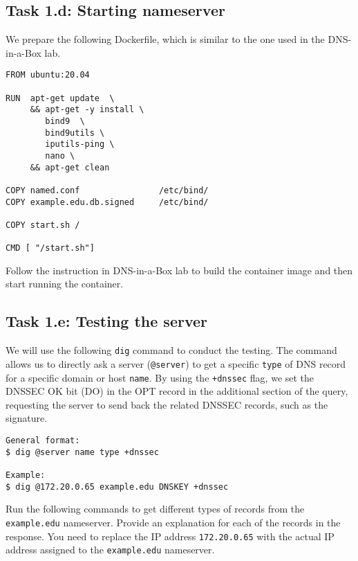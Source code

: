 \subsection{Task 1.d: Starting nameserver}

We prepare the following Dockerfile, which is similar to the one used in 
the DNS-in-a-Box lab. 

\begin{lstlisting}
FROM ubuntu:20.04

RUN  apt-get update  \
     && apt-get -y install \
        bind9  \
        bind9utils \
        iputils-ping \
        nano \
     && apt-get clean

COPY named.conf                /etc/bind/
COPY example.edu.db.signed     /etc/bind/

COPY start.sh /

CMD [ "/start.sh"]
\end{lstlisting}
 
Follow the instruction in DNS-in-a-Box lab to build the container image 
and then start running the container. 


\subsection{Task 1.e: Testing the server}


We will use the following \texttt{dig} command to conduct the testing. 
The command allows us to directly ask 
a server (\texttt{@server}) to get a specific \texttt{type}
of DNS record for a specific domain or host \texttt{name}.
By using the \texttt{+dnssec} flag, we set the DNSSEC OK bit (DO) in the OPT record 
in the additional section of the query, requesting the server to
send back the related DNSSEC records, such as the signature. 

\begin{lstlisting}
General format:
$ dig @server name type +dnssec

Example:
$ dig @172.20.0.65 example.edu DNSKEY +dnssec
\end{lstlisting}
 

Run the following commands to get different types of records 
from the \texttt{example.edu} nameserver. Provide an explanation
for each of the records in the response. You need to 
replace the IP address \texttt{172.20.0.65} with the actual
IP address assigned to the \texttt{example.edu} nameserver.

